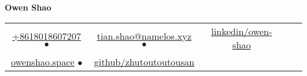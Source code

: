 \documentclass[11pt]{article}
\begin{document}
    \fontsize{10}{13}
    \selectfont
    \begin{center}
        \begin{center}
            \Huge\bfseries Owen Shao
        \end{center}
        \vspace{1em}
            \begin{tabular}{c c c c c}
                \href{tel:Phone-Number}{+8618018607207} $\bullet$ & 
                \href{mailto:mailid@mail.com}{tian.shao@namelos.xyz} $\bullet$ & 
                \href{https://www.linkedin.com/in/tian-shao-113947104/}{linkedin/owen-shao} \\
                \href{https://www.owenshao.space/}{owenshao.space} $\bullet$ &  
                \href{https://github.com/zhutoutoutousan}{github/zhutoutoutousan} \\
        \end{tabular}
    \end{center}    
    \vspace{-0.5em}

           
    
    
\end{document}
